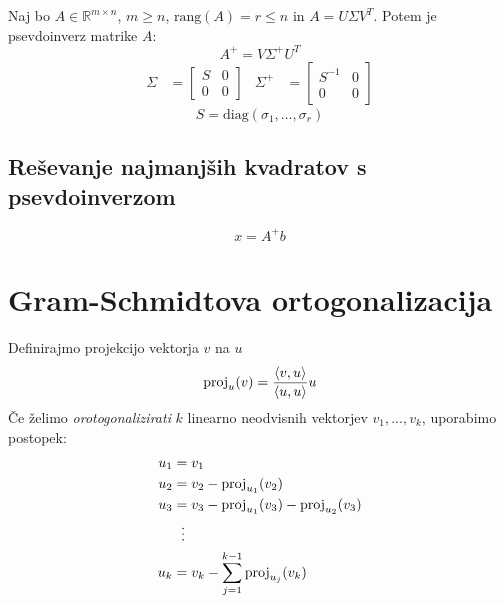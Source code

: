 \begin{multicols}{5}
Naj bo $A \in \mathbb{R}^{m\times n}$, $m \geq n$, $\text{rang}(A) = r \leq n$ in $A = U \Sigma V^T$.
Potem je psevdoinverz matrike $A$:
\[A^+ = V \Sigma^+ U^T\]
\begin{align*}
	\Sigma &= \begin{bmatrix}
		S & 0 \\ 0 & 0
	\end{bmatrix} &
	\Sigma^+ &= \begin{bmatrix}
		S^{-1} & 0 \\ 0 & 0
	\end{bmatrix}
\end{align*}
\[ S = \text{diag}(\sigma_1, \dots, \sigma_r) \]

\subsection{Reševanje najmanjših kvadratov s psevdoinverzom}
\[ x = A^+ b\]

\section{Gram-Schmidtova ortogonalizacija}
Definirajmo projekcijo vektorja $v$ na $u$
\[\textmd{proj}_u(v) = \frac{\langle v,u \rangle}{\langle u,u \rangle}u\]
Če želimo \emph{orotogonalizirati} $k$ linearno neodvisnih vektorjev $v_1, ..., v_k$, uporabimo postopek:
\begin{equation*}
    \begin{aligned}
    u_1 &= v_1 \\
    u_2 &= v_2 - \textmd{proj}_{u_1}(v_2) \\
    u_3 &= v_3 - \textmd{proj}_{u_1}(v_3) - \textmd{proj}_{u_2}(v_3) \\
    &\; \ \vdots \\
    u_k &= v_k - \sum_{j=1}^{k-1} \textmd{proj}_{u_j}(v_k)
    \end{aligned}
\end{equation*}
\end{multicols}
